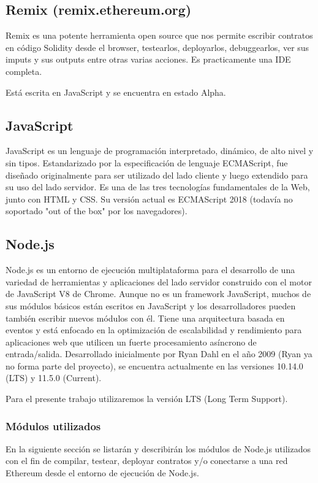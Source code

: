 \subsection{Remix (remix.ethereum.org)}
Remix es una potente herramienta open source que nos permite escribir contratos en código
Solidity desde el browser, testearlos, deployarlos, debuggearlos, ver sus imputs y sus outputs
entre otras varias acciones. Es practicamente una IDE completa.

Está escrita en JavaScript y se encuentra en estado Alpha.

\subsection{JavaScript}
JavaScript es un lenguaje de programación interpretado, dinámico, de alto nivel y sin
tipos. Estandarizado por la especificación de lenguaje ECMAScript, fue diseñado originalmente para
ser utilizado del lado cliente y luego extendido para su uso del lado servidor. Es una de las tres
tecnologías fundamentales de la Web, junto con HTML y CSS. Su versión actual es ECMAScript 2018
(todavía no soportado "out of the box" por los navegadores).


\subsection{Node.js}
Node.js es un entorno de ejecución multiplataforma para el desarrollo de una variedad de
herramientas y aplicaciones del lado servidor construido con el motor de JavaScript V8 de Chrome.
Aunque no es un framework JavaScript, muchos de sus módulos básicos están escritos en JavaScript y
los desarrolladores pueden también escribir nuevos módulos con él. Tiene una arquitectura basada en
eventos y está enfocado en la optimización de escalabilidad y rendimiento para aplicaciones web que
utilicen un fuerte procesamiento asíncrono de entrada/salida. Desarrollado inicialmente por Ryan
Dahl en el año 2009 (Ryan ya no forma parte del proyecto), se encuentra actualmente en las
versiones 10.14.0 (LTS) y 11.5.0 (Current).

Para el presente trabajo utilizaremos la versión LTS (Long Term Support).


\subsubsection{Módulos utilizados}
En la siguiente sección se listarán y describirán los módulos de Node.js utilizados con el fin de
compilar, testear, deployar contratos y/o conectarse a una red Ethereum desde el entorno de
ejecución de Node.js.

